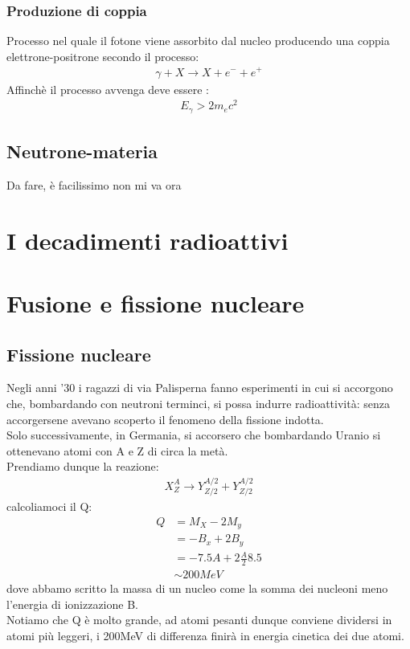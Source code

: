 \subsection{Produzione di coppia}
Processo nel quale il fotone viene assorbito dal nucleo producendo una coppia elettrone-positrone 
secondo il processo:
\begin{align*}
    \gamma + X \rightarrow X + e^{-} + e^{+}
\end{align*}
Affinchè il processo avvenga deve essere :
\begin{align*}
    E_{\gamma} > 2m_{e}c^2
\end{align*}
\section{Neutrone-materia}
Da fare, è facilissimo non mi va ora
\newpage
\chapter{I decadimenti radioattivi}
\chapter{Fusione e fissione nucleare}
\section{Fissione nucleare}
Negli anni '30 i ragazzi di via Palisperna fanno esperimenti in cui si accorgono che, bombardando con 
neutroni terminci, si possa indurre radioattività: senza accorgersene avevano scoperto il 
fenomeno della fissione indotta.\\
Solo successivamente, in Germania, si accorsero che bombardando Uranio si ottenevano atomi
con A e Z di circa la metà.\\
Prendiamo dunque la reazione:
\begin{align*}
    X^{A}_{Z} \rightarrow Y^{A/2}_{Z/2} + Y^{A/2}_{Z/2}
\end{align*}
calcoliamoci il Q:
\begin{align*}
        Q &= M_{X}-2M_{y}\\
          &= -B_{x}+2B_{y}\\
          &=-7.5A + 2\frac{A}{2}8.5\\
          &\sim 200MeV \tag*{Per atomi pesanti}
\end{align*}
dove abbamo scritto la massa di un nucleo come la somma dei nucleoni meno l'energia di ionizzazione B.\\
Notiamo che Q è molto grande, ad atomi pesanti dunque conviene dividersi in atomi più leggeri,
i 200MeV di differenza finirà in energia cinetica dei due atomi.
